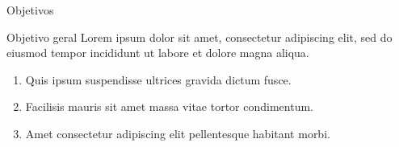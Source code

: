 \begin{frame}{Objetivos}
  \begin{block}{Objetivo geral}
    Lorem ipsum dolor sit amet, consectetur adipiscing elit, sed do eiusmod
    tempor incididunt ut labore et dolore magna aliqua.
  \end{block}

  \begin{enumerate}
    \item Quis ipsum suspendisse ultrices gravida dictum fusce.
    \item Facilisis mauris sit amet massa vitae tortor condimentum.
    \item Amet consectetur adipiscing elit pellentesque habitant morbi.
  \end{enumerate}
\end{frame}